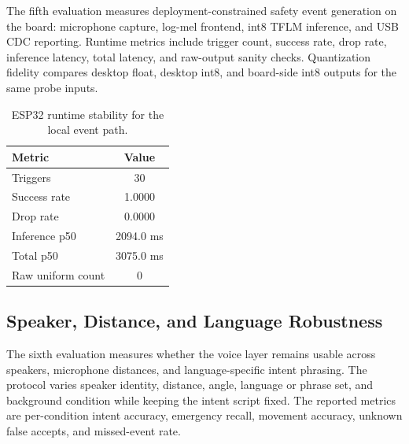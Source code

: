 The fifth evaluation measures deployment-constrained safety event generation on the board: microphone capture, log-mel frontend, int8 TFLM inference, and USB CDC reporting. Runtime metrics include trigger count, success rate, drop rate, inference latency, total latency, and raw-output sanity checks. Quantization fidelity compares desktop float, desktop int8, and board-side int8 outputs for the same probe inputs.

\begin{table}[t]
    \centering
    \caption{ESP32 runtime stability for the local event path.}
    \label{tab:runtime_evidence}
    \begin{tabular}{lc}
        \toprule
        Metric & Value \\
        \midrule
        Triggers & 30 \\
        Success rate & 1.0000 \\
        Drop rate & 0.0000 \\
        Inference p50 & 2094.0 ms \\
        Total p50 & 3075.0 ms \\
        Raw uniform count & 0 \\
        \bottomrule
    \end{tabular}
\end{table}

\subsection{Speaker, Distance, and Language Robustness}

The sixth evaluation measures whether the voice layer remains usable across speakers, microphone distances, and language-specific intent phrasing. The protocol varies speaker identity, distance, angle, language or phrase set, and background condition while keeping the intent script fixed. The reported metrics are per-condition intent accuracy, emergency recall, movement accuracy, unknown false accepts, and missed-event rate.

